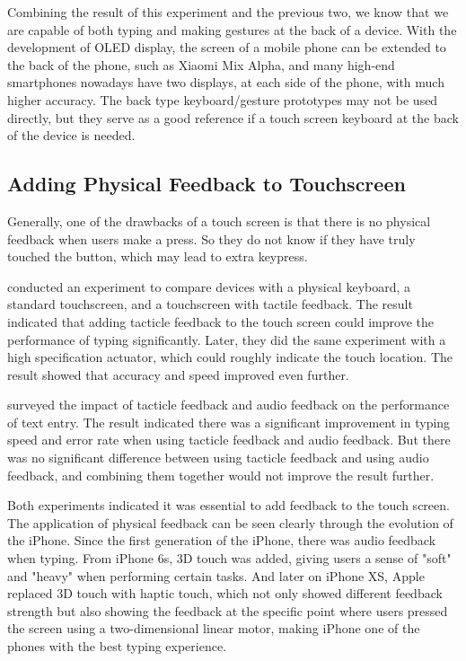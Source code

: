\documentclass[11pt]{article}
\begin{document}
Combining the result of this experiment and the previous two, we know that we are capable of both typing and making gestures at the back of a device. With the development of OLED display, the screen of a mobile phone can be extended to the back of the phone, such as Xiaomi Mix Alpha, and many high-end smartphones nowadays have two displays, at each side of the phone, with much higher accuracy. The back type keyboard/gesture prototypes may not be used directly, but they serve as a good reference if a touch screen keyboard at the back of the device is needed. 

\subsection{Adding Physical Feedback to Touchscreen}

Generally, one of the drawbacks of a touch screen is that there is no physical feedback when users make a press. So they do not know if they have truly touched the button, which may lead to extra keypress.

\citet{10.1145/1357054.1357300} conducted an experiment to compare devices with a physical keyboard, a standard touchscreen, and a touchscreen with tactile feedback. The result indicated that adding tacticle feedback to the touch screen could improve the performance of typing significantly. Later, they did the same experiment with a high specification actuator, which could roughly indicate the touch location. The result showed that accuracy and speed improved even further. 

\citet{10.1145/1518701.1518750} surveyed the impact of tacticle feedback and audio feedback on the performance of text entry. The result indicated there was a significant improvement in typing speed and error rate when using tacticle feedback and audio feedback. But there was no significant difference between using tacticle feedback and using audio feedback, and combining them together would not improve the result further. 

Both experiments indicated it was essential to add feedback to the touch screen. The application of physical feedback can be seen clearly through the evolution of the iPhone. Since the first generation of the iPhone, there was audio feedback when typing. From iPhone 6s, 3D touch was added, giving users a sense of "soft" and "heavy" when performing certain tasks. And later on iPhone XS, Apple replaced 3D touch with haptic touch, which not only showed different feedback strength but also showing the feedback at the specific point where users pressed the screen using a two-dimensional linear motor, making iPhone one of the phones with the best typing experience.
\end{document}
